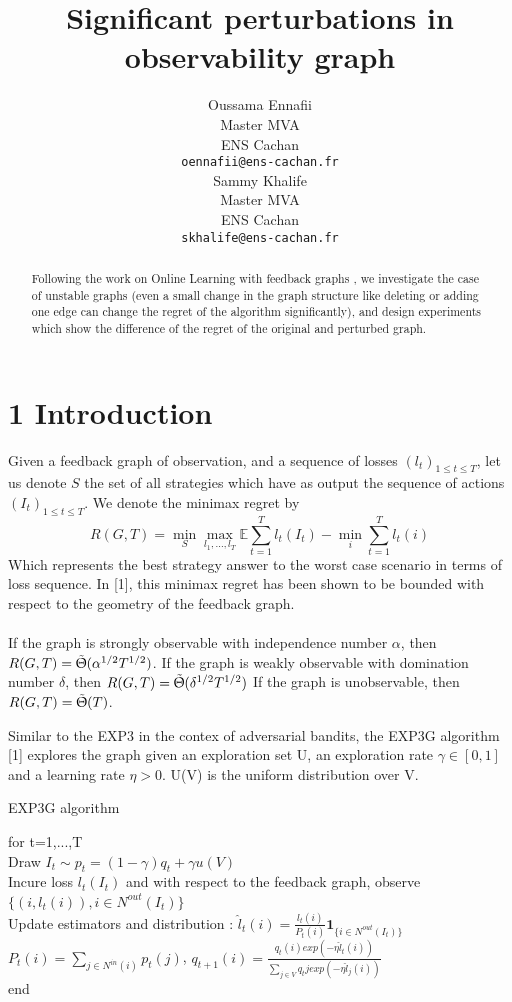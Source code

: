 \documentclass{article} %
\title{Significant perturbations in observability graph}
\author{
Oussama Ennafii\\
Master MVA\\
ENS Cachan\\
\texttt{oennafii@ens-cachan.fr} \\
\And
Sammy Khalife \\
Master MVA\\
ENS Cachan\\
\texttt{skhalife@ens-cachan.fr}
}
\begin{document}
\maketitle

\begin{abstract}
Following the work on Online Learning with feedback graphs \cite{journals/corr/AlonCDK15} ,
we investigate the case of unstable graphs (even a small change in the graph structure like deleting or adding one edge can change the regret of the algorithm significantly), and design experiments which show the difference of the regret of the original and perturbed graph.
\end{abstract}

\section*{1 Introduction}
Given a feedback graph of observation, and a sequence of losses $(l_t)_{1 \leq t \leq T}$, let us denote $S$ the set of all strategies which have as output the sequence of actions $(I_t)_{1 \leq t \leq T}$. We denote the minimax regret by 
$$ R(G,T)=\min_{S} \max_{l_1,...,l_T} \mathbb{E}  \sum_{t=1}^{T} l_t(I_t) -\min_{i} \sum_{t=1}^{T}l_t(i)  $$
Which represents the best strategy answer to the worst case scenario in terms of loss sequence.
In [1], this minimax regret has been shown to be bounded with respect to the geometry of the feedback graph.~\\
~\\
If the graph is strongly observable with independence number $\alpha$, then 
$ R(G,T) = \tilde{\Uptheta}(\alpha^{1/2}T^{1/2})$.
If the graph is weakly observable with domination number $\delta$, then 
$ R(G,T) = \tilde{\Uptheta}(\delta^{1/2}T^{1/2})$
If the graph is unobservable, then 
$ R(G,T) = \tilde{\Uptheta}(T) $.

Similar to the EXP3 in the contex of adversarial bandits, the EXP3G algorithm [1] explores the graph given an exploration set U, an exploration rate $\gamma \in [0,1]$ and a learning rate $\eta > 0$. U(V) is the uniform distribution over V.

 \FloatBarrier
 \begin{algorithm}
 	\caption{EXP3G algorithm}\label{RS}
 	for t=1,...,T ~\\
 	Draw $ I_t \sim p_t = (1-\gamma)q_t + \gamma u(V) $ ~\\
 	Incure loss $l_t(I_t)$ and with respect to the feedback graph, observe $\{(i,l_t(i)), i \in N^{out}(I_t)\}$ ~\\
 	Update estimators and distribution :
 	$\hat{l}_{t}(i)=\frac{l_t(i)}{P_{t}(i)} \textbf{1}_{\{ i \in N^{out}(I_t)\}} \qquad$ $P_t(i)=\sum_{j \in N^{in}(i)}p_{t}(j)$, 
 	$q_{t+1}(i)=\frac{q_t(i)exp(-\eta \hat{l}_{t}(i))}{\sum_{j \in V}q_t{j}exp(-\eta \hat{l}_{j}(i))}$~\\
 	end
 \end{algorithm}
 \FloatBarrier
 
\end{document}
